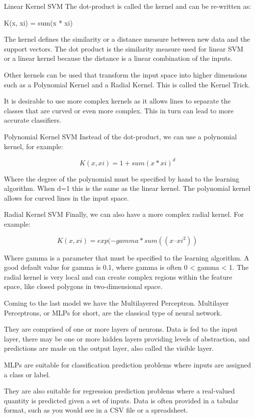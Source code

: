 \documentclass[12pt]{article}
\begin{document}
Linear Kernel SVM
The dot-product is called the kernel and can be re-written as:

K(x, xi) = sum(x * xi)

The kernel defines the similarity or a distance measure between new data and the support vectors. The dot product is the similarity measure used for linear SVM or a linear kernel because the distance is a linear combination of the inputs.

Other kernels can be used that transform the input space into higher dimensions such as a Polynomial Kernel and a Radial Kernel. This is called the Kernel Trick.

It is desirable to use more complex kernels as it allows lines to separate the classes that are curved or even more complex. This in turn can lead to more accurate classifiers.

Polynomial Kernel SVM
Instead of the dot-product, we can use a polynomial kernel, for example:

$$K(x,xi) = 1 + sum(x * xi)^d$$

Where the degree of the polynomial must be specified by hand to the learning algorithm. When d=1 this is the same as the linear kernel. The polynomial kernel allows for curved lines in the input space.

Radial Kernel SVM
Finally, we can also have a more complex radial kernel. For example:

$$K(x,xi) = exp(-gamma * sum((x – xi^2))$$

Where gamma is a parameter that must be specified to the learning algorithm. A good default value for gamma is 0.1, where gamma is often 0 < gamma < 1. The radial kernel is very local and can create complex regions within the feature space, like closed polygons in two-dimensional space.


Coming to the last model we have the Multilayered Perceptron. Multilayer Perceptrons, or MLPs for short, are the classical type of neural network.

They are comprised of one or more layers of neurons. Data is fed to the input layer, there may be one or more hidden layers providing levels of abstraction, and predictions are made on the output layer, also called the visible layer.

MLPs are suitable for classification prediction problems where inputs are assigned a class or label.

They are also suitable for regression prediction problems where a real-valued quantity is predicted given a set of inputs. Data is often provided in a tabular format, such as you would see in a CSV file or a spreadsheet.
\end{document}
